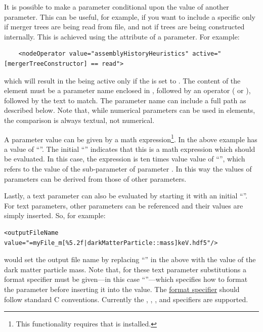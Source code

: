 It is possible to make a parameter conditional upon the value of another parameter. This can be useful, for example, if you want to include a specific  only if merger trees are being read from file, and not if trees are being constructed internally. This is achieved using the  attribute of a parameter. For example:
\begin{verbatim}
    <nodeOperator value="assemblyHistoryHeuristics" active="[mergerTreeConstructor] == read">
\end{verbatim}
which will result in the   being active only if the  is set to . The content of the  element must be a parameter name enclosed in \mono{[]}, followed by an operator (\mono{==} or \mono{!=}), followed by the text to match. The parameter name can include a full path as described below. Note that, while numerical parameters can be used in  elements, the comparison is always textual, not numerical.

A parameter value can be given by a math expression\footnote{This functionality requires that  is installed.}. In the above example  has a value of ``''. The initial ``\mono{=}'' indicates that this is a math expression which should be evaluated. In this case, the expression is ten times value value of ``'', which refers to the value of the sub-parameter  of parameter . In this way the values of parameters can be derived from those of other parameters.

Lastly, a text parameter can also be evaluated by starting it with an initial ``\mono{=}''. For text parameters, other parameters can be referenced and their values are simply inserted. So, for example:
\begin{verbatim}
<outputFileName value="=myFile_m[%5.2f|darkMatterParticle::mass]keV.hdf5"/>
\end{verbatim}
would set the output file name by replacing ``'' in the above with the value of the dark matter particle mass. Note that, for these text parameter substitutions a format specifier must be given---in this case ``''---which specifies how to format the parameter before inserting it into the value. The \href{https://www.w3resource.com/c-programming/stdio/c_library_method_sprintf.php}{format specifier} should follow standard C conventions. Currently the , , , and specifiers are supported.

